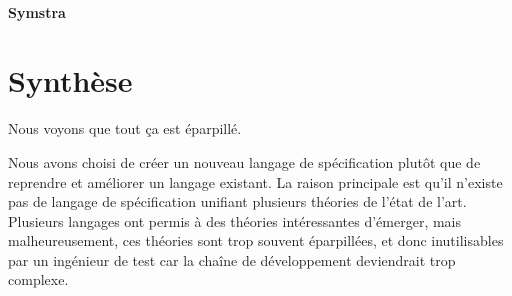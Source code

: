 \paragraph{Symstra}

\section{Synthèse}

Nous voyons que tout ça est éparpillé.

Nous avons choisi de créer un nouveau langage de spécification plutôt que de
reprendre et améliorer un langage existant.
La raison principale est qu'il n'existe pas de langage de spécification unifiant
plusieurs théories de l'état de l'art. Plusieurs langages ont permis à des
théories intéressantes d'émerger, mais malheureusement, ces théories sont
trop souvent éparpillées, et donc inutilisables par un ingénieur de test car la
chaîne de développement deviendrait trop complexe.


